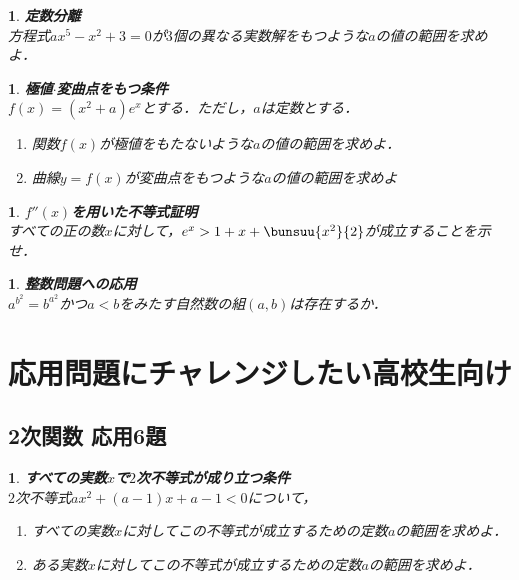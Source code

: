 \documentclass[10pt,
fleqn,
dvipdfmx,
uplatex
]{jsarticle}
\newtheorem{question}[Question]{}
\begin{document}
\begin{question}{\bf\boldmath 定数分離}\\
方程式$ax^5-x^2+3=0$が$3$個の異なる実数解をもつような$a$の値の範囲を求めよ．
\end{question}



\begin{question}{\bf\boldmath 極値$\cdot$変曲点をもつ条件}\\
$f\left(x\right)=\left(x^2+a\right)e^x$とする．ただし，$a$は定数とする．
\begin{enumerate}
\item 関数$f\left(x\right)$が極値をもたないような$a$の値の範囲を求めよ．
\item 曲線$y=f\left(x\right)$が変曲点をもつような$a$の値の範囲を求めよ
\end{enumerate}

\end{question}



\begin{question}{\bf\boldmath $f''\left(x\right)$を用いた不等式証明}\\
すべての正の数$x$に対して，$e^x>1+x+\bunsuu{{x^2}}{2}$が成立することを示せ．
\end{question}



\begin{question}{\bf\boldmath 整数問題への応用}\\
$a^{b^2}=b^{a^2}$かつ$a<b$をみたす自然数の組$\left(a,b\right)$は存在するか．
\end{question}

\section{応用問題にチャレンジしたい高校生向け}

\subsection{2次関数 応用6題}



\begin{question}{\bf\boldmath すべての実数$x$で$2$次不等式が成り立つ条件}\\
$2$次不等式$ax^2+\left(a-1\right)x+a-1<0$について，
\begin{enumerate}
\item すべての実数$x$に対してこの不等式が成立するための定数$a$の範囲を求めよ．
\item ある実数$x$に対してこの不等式が成立するための定数$a$の範囲を求めよ．
\end{enumerate}

\end{question}
\end{document}
